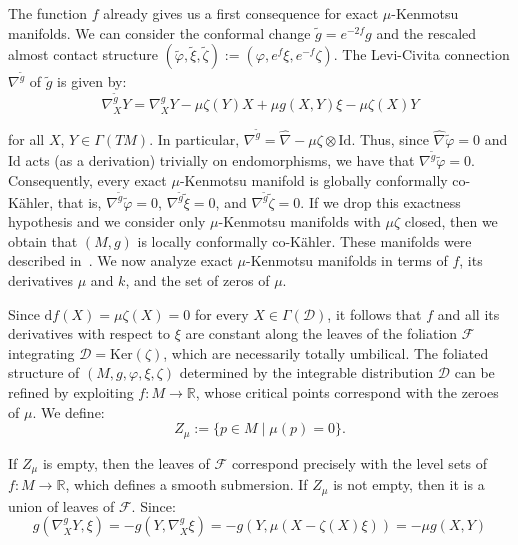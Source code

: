 \documentclass[10pt,a4paper,twoside,reqno]{amsart}
\theoremstyle{plain}
\theoremstyle{definition}
\theoremstyle{remark}
\def\dd{\mathrm{d}}
\def\cD{\mathcal{D}}
\def\cF{\mathcal{F}}
\def\dd{\mathrm{d}}
\begin{document}
\noindent
The function $f$ already gives us a first consequence for exact $\mu$-Kenmotsu manifolds. We can consider the conformal change $\tilde g = e^{-2f} g$ and the rescaled almost contact structure $(\tilde\varphi,\tilde\xi,\tilde\zeta) := (\varphi,e^f\xi,e^{-f}\zeta)$. The Levi-Civita connection $\nabla^{\tilde g}$ of $\tilde g$ is given by:
\begin{equation*}
    \nabla^{\tilde g}_XY = \nabla^g_XY - \mu\zeta(Y)X + \mu g(X,Y)\xi - \mu\zeta(X)Y
\end{equation*}

\noindent
for all $X$, $Y\in\Gamma(TM)$. In particular, $\nabla^{\tilde g} = \hat\nabla - \mu\zeta \otimes \mathrm{Id}$. Thus, since $\hat\nabla\tilde\varphi = 0$ and $\mathrm{Id}$ acts (as a derivation) trivially on endomorphisms, we have that $\nabla^{\tilde g}\tilde\varphi = 0$. Consequently, every exact $\mu$-Kenmotsu manifold is globally conformally co-Kähler, that is, $\nabla^{\tilde g}\tilde\varphi=0$, $\nabla^{\tilde g}\tilde\xi =0$, and $\nabla^{\tilde g}\tilde\zeta=0$. If we drop this exactness hypothesis and we consider only $\mu$-Kenmotsu manifolds with $\mu\zeta$ closed, then we obtain that $(M,g)$ is locally conformally co-Kähler. These manifolds were described in~\cite[Cor.~5.1]{C2026*}. We now analyze exact $\mu$-Kenmotsu manifolds in terms of $f$, its derivatives $\mu$ and $k$, and the set of zeros of $\mu$.\medskip

Since $\dd f(X) = \mu \zeta (X) = 0 $ for every $X\in \Gamma(\cD)$, it follows that $f$ and all its derivatives with respect to $\xi$ are constant along the leaves of the foliation $\cF$ integrating $\cD = \mathrm{Ker}(\zeta)$, which are necessarily totally umbilical. The foliated structure of $(M,g,\varphi,\xi,\zeta)$ determined by the integrable distribution $\cD$ can be refined by exploiting $f\colon M\to \mathbb{R}$, whose critical points correspond with the zeroes of $\mu$. We define:
\begin{equation*}
Z_\mu:=\{p\in M\mid \mu(p)=0\}.
\end{equation*}

If $Z_{\mu}$ is empty, then the leaves of $\cF$ correspond precisely with the level sets of $f \colon M \to \mathbb{R}$, which defines a smooth submersion. If $Z_{\mu}$ is not empty, then it is a union of leaves of $\cF$. Since:
\begin{equation*}
g(\nabla_X^g Y, \xi) = -g(Y, \nabla_X^g \xi)= -g(Y,  \mu (X - \zeta(X)\xi)) = -\mu g(X,Y)
\end{equation*}
\end{document}
